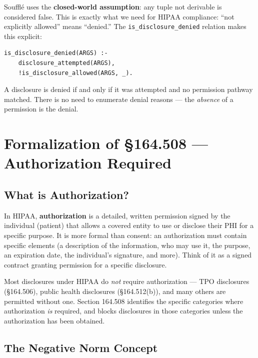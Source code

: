 \documentclass[11pt,letterpaper]{article}
\begin{document}
Souffl\'{e} uses the \textbf{closed-world assumption}: any tuple not derivable is considered false. This is exactly what we need for HIPAA compliance: ``not explicitly allowed'' means ``denied.'' The \texttt{is\_disclosure\_denied} relation makes this explicit:

\begin{lstlisting}[style=soufflestyle]
is_disclosure_denied(ARGS) :-
    disclosure_attempted(ARGS),
    !is_disclosure_allowed(ARGS, _).
\end{lstlisting}

A disclosure is denied if and only if it was attempted and no permission pathway matched. There is no need to enumerate denial reasons --- the \emph{absence} of a permission is the denial.


\section{Formalization of \S 164.508 --- Authorization Required}
\label{sec:508}

\subsection{What is Authorization?}

In HIPAA, \textbf{authorization} is a detailed, written permission signed by the individual (patient) that allows a covered entity to use or disclose their PHI for a specific purpose. It is more formal than consent: an authorization must contain specific elements (a description of the information, who may use it, the purpose, an expiration date, the individual's signature, and more). Think of it as a signed contract granting permission for a specific disclosure.

Most disclosures under HIPAA do \emph{not} require authorization --- TPO disclosures (\S 164.506), public health disclosures (\S 164.512(b)), and many others are permitted without one. Section 164.508 identifies the specific categories where authorization \emph{is} required, and blocks disclosures in those categories unless the authorization has been obtained.

\subsection{The Negative Norm Concept}
\end{document}
